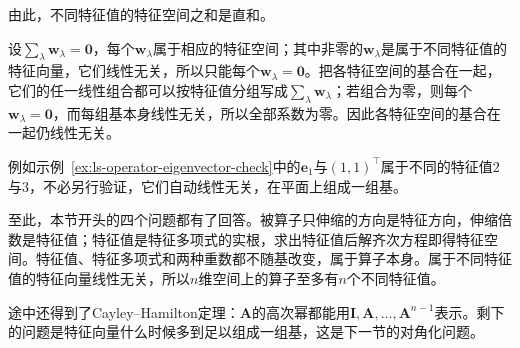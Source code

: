 由此，不同特征值的特征空间之和是直和。

设$\sum_\lambda\bm w_\lambda=\bm0$，每个$\bm w_\lambda$属于相应的特征空间；其中非零的$\bm w_\lambda$是属于不同特征值的特征向量，它们线性无关，所以只能每个$\bm w_\lambda=\bm0$。把各特征空间的基合在一起，它们的任一线性组合都可以按特征值分组写成$\sum_\lambda\bm w_\lambda$；若组合为零，则每个$\bm w_\lambda=\bm0$，而每组基本身线性无关，所以全部系数为零。因此各特征空间的基合在一起仍线性无关。

例如示例~\ref{ex:ls-operator-eigenvector-check}中的$\bm e_1$与$(1,1)^{\top}$属于不同的特征值$2$与$3$，不必另行验证，它们自动线性无关，在平面上组成一组基。

至此，本节开头的四个问题都有了回答。被算子只伸缩的方向是特征方向，伸缩倍数是特征值；特征值是特征多项式的实根，求出特征值后解齐次方程即得特征空间。特征值、特征多项式和两种重数都不随基改变，属于算子本身。属于不同特征值的特征向量线性无关，所以$n$维空间上的算子至多有$n$个不同特征值。

途中还得到了Cayley--Hamilton定理：$\bm A$的高次幂都能用$\bm I,\bm A,\ldots,\bm A^{n-1}$表示。剩下的问题是特征向量什么时候多到足以组成一组基，这是下一节的对角化问题。
